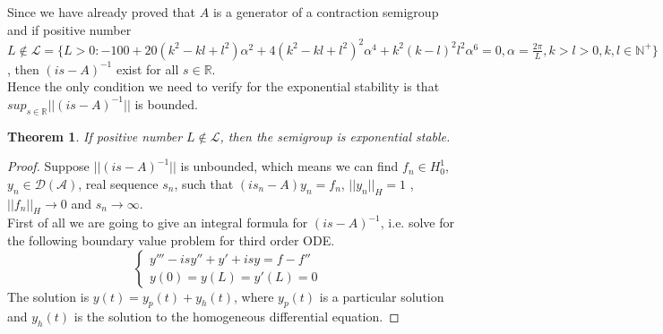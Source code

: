 \documentclass[a4paper,draft]{amsproc}
\theoremstyle{plain}
\newtheorem{thm}{Theorem}[section]
\theoremstyle{definition}
\theoremstyle{remark}
\numberwithin{equation}{section}
\begin{document}
Since we have already proved that $A$ is a generator of a contraction semigroup and if positive number $L \not\in {\mathcal{L}}=\{L>0:-100+20 \left(k^2-k l+l^2\right) \alpha^2 +4 \left(k^2-k l+l^2\right)^2 \alpha ^4+k^2 (k-l)^2 l^2 \alpha ^6=0,\alpha =\frac{2\pi}{L},k>l>0, k,l \in \mathbb{N^+}\}$, then $(is-A)^{-1}$ exist for all $s\in {\mathbb{R}}$.\\
Hence the only condition we need to verify for the exponential stability is that $sup_{s\in {\mathbb{R}}}||(is-A)^{-1}||$ is bounded.\\
\linebreak
\begin{thm}
	If positive number $L \not\in {\mathcal{L}}$, then the semigroup is exponential stable. 
\end{thm}
\begin{proof}
Suppose $||(is-A)^{-1}||$ is unbounded, which means we can find $f_n\in H^1_0$, $y_n \in \mathcal{D(A)}$, real sequence ${s_n}$, such that $(is_n-A)y_n=f_n$, $||y_n||_{H}=1$ ,$||f_n||_{H}\rightarrow 0$ and $s_n\rightarrow \infty$.\\
First of all we are going to give an integral formula for $(is-A)^{-1}$, i.e. solve for the following boundary value problem for third order ODE. 
\begin{equation*}
\left\{
\begin{array}{lr}
y'''-isy''+y'+isy=f-f''  &  \\
y(0)=y(L)=y'(L)=0
\end{array}
\right.
\end{equation*}
The solution is $y(t)=y_p(t)+y_h(t)$, where $y_p(t)$ is a particular solution and $y_h(t)$ is the solution to the homogeneous differential equation. 


\end{proof}
\end{document}
